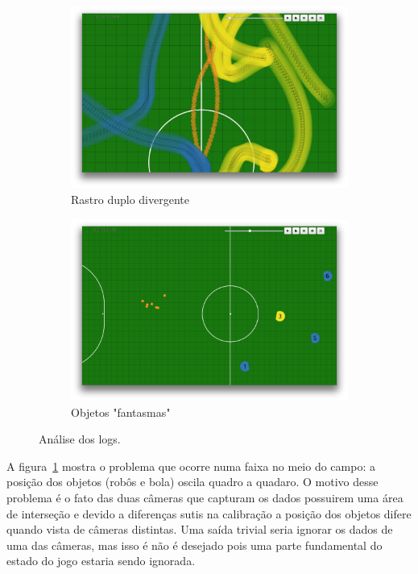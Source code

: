 \begin{figure}[thpb]
  \centering
  \begin{subfigure}[b]{0.49\textwidth}
    \includegraphics[width=\textwidth]{figuras/log_rastro.png}
    \caption{Rastro duplo divergente}\label{fig:log_rastro}
  \end{subfigure}
  \begin{subfigure}[b]{0.49\textwidth}
    \includegraphics[width=\textwidth]{figuras/log_multi.png}
    \caption{Objetos "fantasmas"}\label{fig:log_multi}
  \end{subfigure}
  \caption{Análise dos logs.}\label{fig:logs}
\end{figure}

A figura~\ref{fig:log_rastro} mostra o problema que ocorre numa faixa no meio do
campo: a posição dos objetos (robôs e bola) oscila quadro a quadaro. O motivo
desse problema é o fato das duas câmeras que capturam os dados possuirem uma
área de interseção e devido a diferenças sutis na calibração a posição dos
objetos difere quando vista de câmeras distintas. Uma saída trivial seria
ignorar os dados de uma das câmeras, mas isso é não é desejado pois uma parte
fundamental do estado do jogo estaria sendo ignorada.

